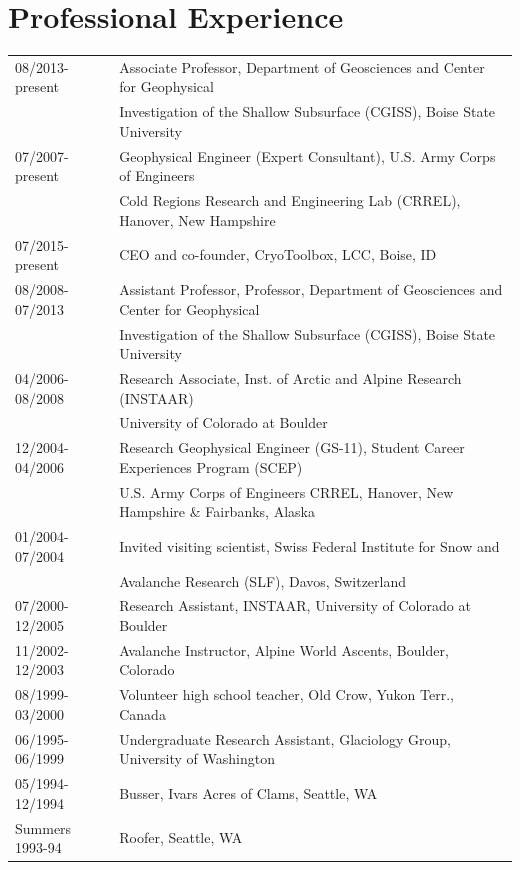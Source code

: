 \documentclass[11pt]{article}
\begin{document}
\section*{Professional Experience}
\begin{tabular}{ll}
08/2013-present & Associate Professor, Department of Geosciences and Center for Geophysical \\
&   Investigation of the Shallow Subsurface (CGISS), Boise State University \\
07/2007-present & Geophysical Engineer (Expert Consultant), U.S. Army Corps of Engineers \\
& Cold Regions Research and Engineering Lab (CRREL), Hanover, New Hampshire \\
07/2015-present & CEO and co-founder, CryoToolbox, LCC, Boise, ID \\
08/2008-07/2013 & Assistant Professor, Professor, Department of Geosciences and Center for Geophysical \\
&   Investigation of the Shallow Subsurface (CGISS), Boise State University \\
04/2006-08/2008 & Research Associate, Inst. of Arctic and Alpine Research (INSTAAR) \\
& University of Colorado at Boulder \\ 
12/2004-04/2006 & Research Geophysical Engineer (GS-11), Student Career Experiences Program (SCEP) \\
& U.S. Army Corps of Engineers CRREL, Hanover, New Hampshire \& Fairbanks, Alaska \\
01/2004-07/2004 & Invited visiting scientist, Swiss Federal Institute for Snow and \\ 
& Avalanche Research (SLF), Davos, Switzerland \\ 
07/2000-12/2005 & Research Assistant, INSTAAR, University of Colorado at Boulder \\
11/2002-12/2003 & Avalanche Instructor, Alpine World Ascents, Boulder, Colorado \\
08/1999-03/2000 & Volunteer high school teacher, Old Crow, Yukon Terr., Canada \\
06/1995-06/1999 & Undergraduate Research Assistant, Glaciology Group, University of Washington \\
05/1994-12/1994 & Busser, Ivars Acres of Clams, Seattle, WA \\
Summers 1993-94 & Roofer, Seattle, WA \\
\end{tabular}
\end{document}
